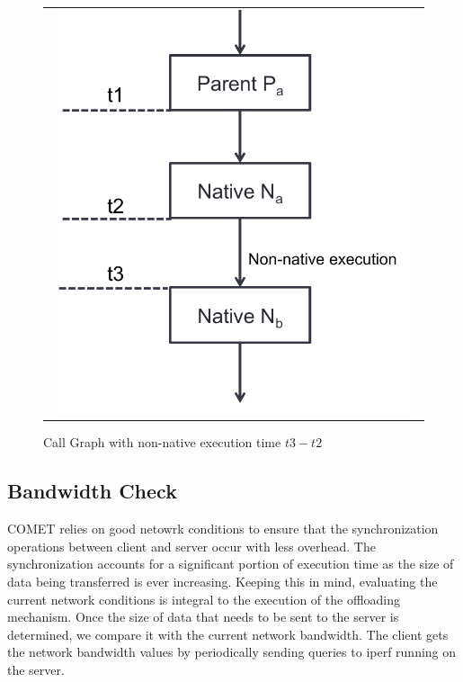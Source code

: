 \begin{figure} [thf*]
\centering
\begin{tabular}{c}
\begin{minipage}[b]{0.5\textwidth}
\includegraphics[width=0.95\textwidth]{figs/native_native.pdf}
\end{minipage}
\end{tabular}
\caption{Call Graph with non-native execution time $t3-t2$}
\label{fig:native_native}
\end{figure}

\subsection{Bandwidth Check}
COMET relies on good netowrk conditions to ensure that the synchronization operations between client and server occur with less overhead.
The synchronization accounts for a significant portion of execution time as the size of data being transferred is ever increasing. Keeping
this in mind, evaluating the current network conditions is integral to the execution of the offloading mechanism. Once the size of data that
needs to be sent to the server is determined, we compare it with the current network bandwidth. The client gets the network bandwidth values by
periodically sending queries to iperf running on the server.
